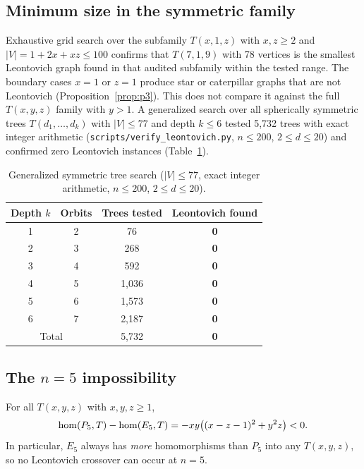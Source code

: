 \subsection{Minimum size in the symmetric family}

Exhaustive grid search over the subfamily $T(x,1,z)$ with $x,z \ge 2$ and
$|V| = 1 + 2x + xz \le 100$ confirms that $T(7,1,9)$ with 78
vertices is the smallest Leontovich graph found in that audited subfamily
within the tested range. The boundary cases $x=1$ or $z=1$ produce star
or caterpillar graphs that are not Leontovich (Proposition~\ref{prop:p3}).
This does not compare it against the full
$T(x,y,z)$ family with $y>1$. A generalized search over all
spherically symmetric trees $T(d_1, \ldots, d_k)$ with $|V| \le 77$ and
depth $k \le 6$ tested 5,732 trees with exact integer arithmetic
(\texttt{scripts/verify\_leontovich.py}, $n \le 200$, $2 \le d \le 20$) and
confirmed zero Leontovich instances (Table~\ref{tab:symmetric}).

\begin{table}[H]
\centering
\caption{Generalized symmetric tree search ($|V| \le 77$, exact integer
arithmetic, $n \le 200$, $2 \le d \le 20$).}
\label{tab:symmetric}
\begin{tabular}{@{}cccc@{}}
  \toprule
  Depth $k$ & Orbits & Trees tested & Leontovich found \\
  \midrule
  1 & 2 &    76 & \textbf{0} \\
  2 & 3 &   268 & \textbf{0} \\
  3 & 4 &   592 & \textbf{0} \\
  4 & 5 & 1,036 & \textbf{0} \\
  5 & 6 & 1,573 & \textbf{0} \\
  6 & 7 & 2,187 & \textbf{0} \\
  \midrule
  \multicolumn{2}{c}{Total} & 5,732 & \textbf{0} \\
  \bottomrule
\end{tabular}
\end{table}

\subsection{The \texorpdfstring{$n = 5$}{n=5} impossibility}

\begin{proposition}[$n = 5$ threshold is algebraically impossible]
  \label{prop:n5}
  For all $T(x,y,z)$ with $x, y, z \ge 1$,
  \[
    \mathrm{hom}(P_5, T) - \mathrm{hom}(E_5, T) = -xy\bigl((x - z - 1)^2 + y^2 z\bigr) < 0.
  \]
  In particular, $E_5$ always has \emph{more} homomorphisms than $P_5$
  into any $T(x,y,z)$, so no Leontovich crossover can occur at $n = 5$.
\end{proposition}

